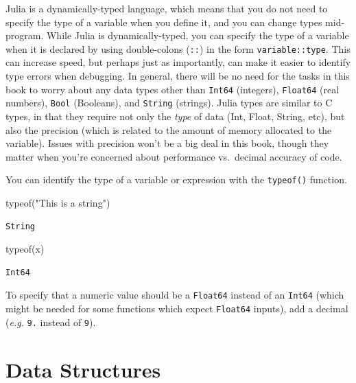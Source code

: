 \documentclass[
  11pt,
]{book}
\newenvironment{Shaded}{\begin{snugshade}}{\end{snugshade}}
\newcommand{\NormalTok}[1]{#1}
\newcommand{\StringTok}[1]{\textcolor[rgb]{0.5,0.5,0.5}{#1}}
\begin{document}
Julia is a dynamically-typed language, which means that you do not need to specify the type of a variable when you define it, and you can change types mid-program. While Julia is dynamically-typed, you can specify the type of a variable when it is declared by using double-colons (\texttt{::}) in the form \texttt{variable::type}. This can increase speed, but perhaps just as importantly, can make it easier to identify type errors when debugging. In general, there will be no need for the tasks in this book to worry about any data types other than \texttt{Int64} (integers), \texttt{Float64} (real numbers), \texttt{Bool} (Booleans), and \texttt{String} (strings). Julia types are similar to C types, in that they require not only the \emph{type} of data (Int, Float, String, etc), but also the precision (which is related to the amount of memory allocated to the variable). Issues with precision won't be a big deal in this book, though they matter when you're concerned about performance vs.~decimal accuracy of code.

You can identify the type of a variable or expression with the \texttt{typeof()} function.

\begin{Shaded}
\begin{Highlighting}[]
\NormalTok{typeof(}\StringTok{"This is a string"}\NormalTok{)}
\end{Highlighting}
\end{Shaded}

\begin{verbatim}
String
\end{verbatim}

\begin{Shaded}
\begin{Highlighting}[]
\NormalTok{typeof(x)}
\end{Highlighting}
\end{Shaded}

\begin{verbatim}
Int64
\end{verbatim}

To specify that a numeric value should be a \texttt{Float64} instead of an \texttt{Int64} (which might be needed for some functions which expect \texttt{Float64} inputs), add a decimal (\emph{e.g.} \texttt{9.} instead of \texttt{9}).

\hypertarget{data-structures}{%
\section{Data Structures}\label{data-structures}}
\end{document}
